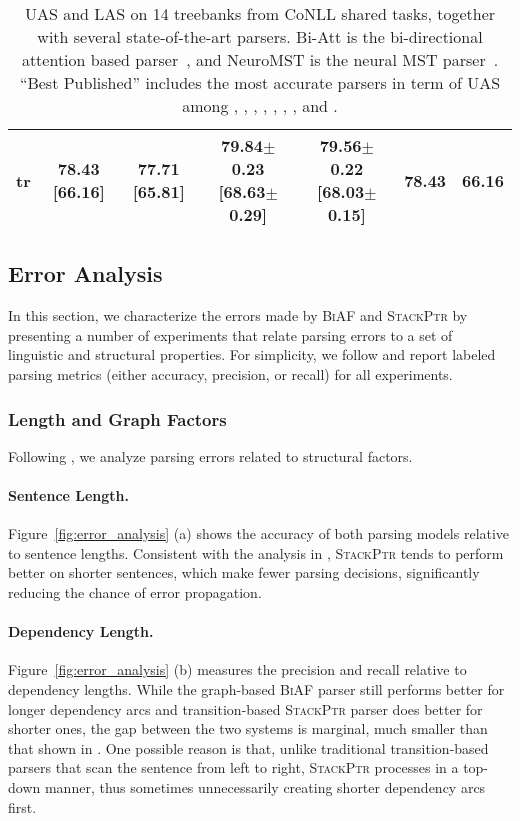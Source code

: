 \documentclass[11pt,a4paper]{article}
\begin{document}
\begin{table*}[t]
{\begin{tabular}[t]{l|c|c|c|c||cc}
tr  & 78.43 [66.16] & 77.71 [65.81] & \textbf{79.84$\pm$0.23 [68.63$\pm$0.29]} & 79.56$\pm$0.22 [68.03$\pm$0.15] & 78.43 & 66.16 \\
\hline
\end{tabular}
}
\caption{UAS and LAS on 14 treebanks from CoNLL shared tasks, together with several state-of-the-art parsers.
\textsf{Bi-Att} is the bi-directional attention based parser~\citep{cheng-EtAl:2016:EMNLP2016}, and \textsf{NeuroMST} is the neural MST parser~\citep{ma-hovy:2017:I17-1}.
``Best Published'' includes the most accurate parsers in term of UAS among \citet{koo-EtAl:2010:EMNLP}, \citet{martins-EtAl:2011:EMNLP1}, \citet{martins:2013:Short}, \citet{lei-EtAl:2014}, \citet{zhang-EtAl:2014:EMNLP20143}, \citet{zhang-mcdonald:2014}, \citet{pitler-mcdonald:2015}, and \citet{cheng-EtAl:2016:EMNLP2016}.}
\label{tab:conll}
\end{table*}

\subsection{Error Analysis}\label{subsec:analyze}
In this section, we characterize the errors made by \textsc{BiAF} and \textsc{StackPtr} by presenting a number of experiments that relate parsing errors to a set of linguistic and structural properties. For simplicity, we follow \citet{mcdonald2011analyzing} and report labeled parsing metrics (either accuracy, precision, or recall) for all experiments.

\subsubsection{Length and Graph Factors}
Following \citet{mcdonald2011analyzing}, we analyze parsing errors related to structural factors.
\paragraph{Sentence Length.}
Figure~\ref{fig:error_analysis} (a) shows the accuracy of both parsing models relative to sentence lengths.
Consistent with the analysis in \citet{mcdonald2011analyzing}, \textsc{StackPtr} tends to perform better on shorter sentences, which make fewer parsing decisions, significantly reducing the chance of error propagation.
\paragraph{Dependency Length.}
Figure~\ref{fig:error_analysis} (b) measures the precision and recall relative to dependency lengths.
While the graph-based \textsc{BiAF} parser still performs better for longer dependency arcs and transition-based \textsc{StackPtr} parser does better for shorter ones, the gap between the two systems is marginal, much smaller than that shown in \citet{mcdonald2011analyzing}. 
One possible reason is that, unlike traditional transition-based parsers that scan the sentence from left to right, \textsc{StackPtr} processes in a top-down manner, thus sometimes unnecessarily creating shorter dependency arcs first.
\end{document}
